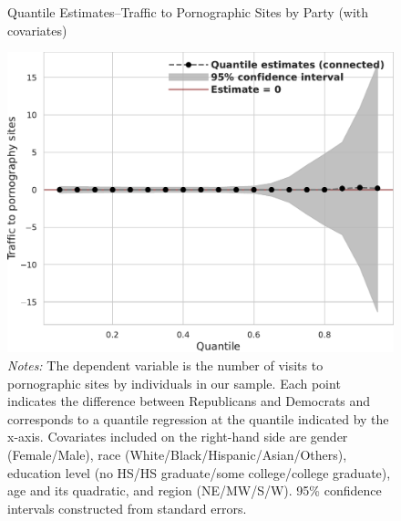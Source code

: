 \documentclass[12pt, letterpaper]{article}
\begin{document}
\begin{figure}
	\centering
	\caption{Quantile Estimates--Traffic to Pornographic Sites by Party (with covariates)}
	\includegraphics[width=.55\linewidth]{figs/quantile_reg_covariates_visits_adult.pdf}
	\caption*{\footnotesize \emph{Notes:} 
		The dependent variable is the number of visits to pornographic sites by individuals in our sample.
		Each point indicates the difference between Republicans and Democrats and corresponds to a quantile regression at the quantile indicated by the x-axis.
		Covariates included on the right-hand side are gender (Female/Male), race (White/Black/Hispanic/Asian/Others), education level (no HS/HS graduate/some college/college graduate), age and its quadratic, and region (NE/MW/S/W).
		95\% confidence intervals constructed from standard errors.
	}
	\label{fig:quantile_regression_visits_covariates}
\end{figure}
\end{document}
